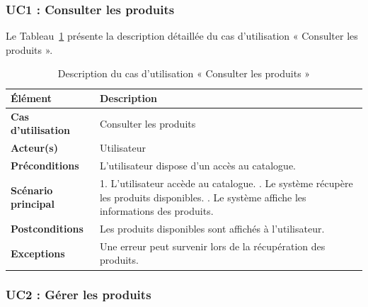 \subsubsection{UC1 : Consulter les produits}

Le Tableau~\ref{tab:uc1_sprint2} présente la description détaillée du cas d’utilisation « Consulter les produits ».
\begin{longtable}{|>{\raggedright\arraybackslash}p{4cm}|>{\raggedright\arraybackslash}p{10.5cm}|}

\caption{Description du cas d’utilisation « Consulter les produits »}
\label{tab:uc1_sprint2}\\

\hline
\textbf{Élément} & \textbf{Description} \\
\hline

\textbf{Cas d’utilisation} & Consulter les produits \\
\hline

\textbf{Acteur(s)} & Utilisateur\\
\hline

\textbf{Préconditions} &
L’utilisateur dispose d’un accès au catalogue. \\
\hline

\textbf{Scénario principal} &

1. L’utilisateur accède au catalogue. \newline
2. Le système récupère les produits disponibles. \newline
3. Le système affiche les informations des produits. \\
   \hline

\textbf{Postconditions} &
Les produits disponibles sont affichés à l’utilisateur. \\
\hline

\textbf{Exceptions} &
Une erreur peut survenir lors de la récupération des produits. \\
\hline

\end{longtable}

\vspace{0.3cm}
\subsubsection{UC2 : Gérer les produits}

